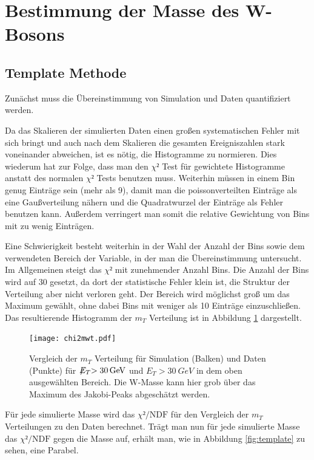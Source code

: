\documentclass[a4paper,12pt]{article}
\newcommand{\met}{\ensuremath{\not\mathrel{E}}_T}
\begin{document}
\newpage
\section{Bestimmung der Masse des W-Bosons}
\subsection{Template Methode}\label{cap:template}
Zunächst muss die Übereinstimmung von Simulation und Daten quantifiziert werden.

Da das Skalieren der simulierten Daten einen großen systematischen Fehler mit sich bringt und auch nach dem
Skalieren die gesamten Ereigniszahlen stark voneinander abweichen, ist es nötig, die Histogramme zu
normieren. Dies wiederum hat zur Folge, dass man den $χ²$ Test für gewichtete Histogramme anstatt
des normalen $χ²$ Tests benutzen
muss\cite{cramer1999mathematical}.
Weiterhin müssen in einem Bin genug
Einträge sein (mehr als 9), damit man die poissonverteilten Einträge als eine Gaußverteilung nähern
und die Quadratwurzel der Einträge als Fehler benutzen kann\cite{ROOT:TH1}. Außerdem verringert man
somit die relative Gewichtung von Bins mit zu wenig Einträgen.

Eine Schwierigkeit besteht weiterhin in der Wahl der Anzahl der Bins sowie dem verwendeten
Bereich der Variable, in der man die Übereinstimmung untersucht. Im Allgemeinen steigt das $χ²$ mit zunehmender Anzahl Bins. Die Anzahl der Bins wird auf
30 gesetzt, da dort der statistische Fehler klein ist, die Struktur der Verteilung aber nicht
verloren geht. Der Bereich wird möglichst groß um das Maximum gewählt, ohne dabei Bins mit weniger als 10 Einträge
einzuschließen. Das resultierende Histogramm der $m_T$ Verteilung ist in Abbildung \ref{fig:compareHistoMT} dargestellt.

\begin{figure}[htb]
	\centering
	\texttt{[image: chi2mwt.pdf]}
	\caption{Vergleich der $m_T$ Verteilung für Simulation (Balken) und Daten (Punkte) für
		$\met>\SI{30}{GeV}$ und $E_T>\SI{30}{GeV}$ in dem oben ausgewählten Bereich. Die W-Masse
		kann hier grob über das Maximum des Jakobi-Peaks abgeschätzt werden.}
	\label{fig:compareHistoMT}
\end{figure}

Für jede simulierte Masse wird das  $χ²/\text{NDF}$ für den Vergleich der $m_T$ Verteilungen
zu den Daten berechnet. 
Trägt man nun für jede simulierte Masse das $χ²/\text{NDF}$ gegen die Masse auf,
erhält man, wie in Abbildung \ref{fig:template} zu sehen, eine Parabel.
\end{document}
